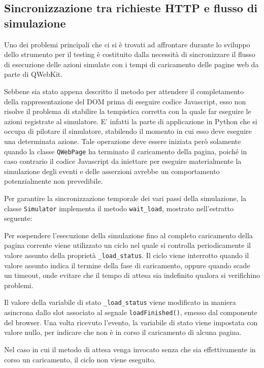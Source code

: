 \documentclass[12pt]{toptesi}
\begin{document}
\subsection{Sincronizzazione tra richieste HTTP e flusso di simulazione}

Uno dei problemi principali che ci si è trovati ad affrontare durante lo sviluppo dello strumento per il testing è costituito dalla necessità di sincronizzare il flusso di esecuzione delle azioni simulate con i tempi di caricamento delle pagine web da parte di QWebKit. 

Sebbene sia stato appena descritto il metodo per attendere il completamento della rappresentazione del DOM prima di eseguire codice Javascript, esso non risolve il problema di stabilire la tempistica corretta con la quale far eseguire le azioni registrate al simulatore. E' infatti la parte di applicazione in Python che si occupa di pilotare il simulatore, stabilendo il momento in cui esso deve eseguire una determinata azione. Tale operazione deve essere iniziata però solamente quando la classe \verb|QWebPage| ha terminato il caricamento della pagina, poiché in caso contrario il codice Javascript da iniettare per eseguire materialmente la simulazione degli eventi e delle asserzioni avrebbe un comportamento potenzialmente non prevedibile. 

Per garantire la sincronizzazione temporale dei vari passi della simulazione, la classe \verb|Simulator| implementa il metodo \verb|wait_load|, mostrato nell'estratto seguente:

 

Per sospendere l'esecuzione della simulazione fino al completo caricamento della pagina corrente viene utilizzato un ciclo nel quale si controlla periodicamente il valore assunto della proprietà \verb|_load_status|. Il ciclo viene interrotto quando il valore assunto indica il termine della fase di caricamento, oppure quando scade un timeout, onde evitare che il tempo di attesa sia indefinito qualora si verifichino problemi. 

Il valore della variabile di stato \verb|_load_status| viene modificato in maniera asincrona dallo slot associato al segnale \verb|loadFinished()|, emesso dal componente del browser. Una volta ricevuto l'evento, la variabile di stato viene impostata con valore nullo, per indicare che non è in corso il caricamento di alcuna pagina.

Nel caso in cui il metodo di attesa venga invocato senza che sia effettivamente in corso un caricamento, il ciclo non viene eseguito.
\end{document}
